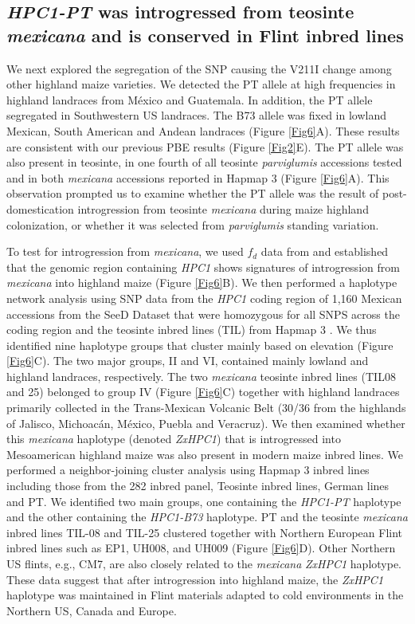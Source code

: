 \documentclass[9pt,twocolumn,twoside,lineno]{biorxiv}
\begin{document}
\subsection{\textit{HPC1-PT} was introgressed from teosinte \textit{mexicana} and is conserved in Flint inbred lines} 
We next explored the segregation of the SNP causing the V211I change among other highland maize varieties.
We detected the PT allele at high frequencies in highland landraces from México and Guatemala. In addition, the PT allele segregated in Southwestern US landraces. 
The B73 allele was fixed in lowland Mexican, South American and Andean landraces (Figure \ref{Fig6}A). 
These results are consistent with our previous PBE results (Figure \ref{Fig2}E).
The PT allele was also present in teosinte, in one fourth of all teosinte \textit{parviglumis} accessions tested and in both \textit{mexicana} accessions reported in Hapmap 3 \cite{Bukowski2017-ng} (Figure \ref{Fig6}A). 
This observation prompted us to examine whether the PT allele was the result of post-domestication introgression from teosinte \textit{mexicana} during maize highland colonization, or whether it was selected from \textit{parviglumis} standing variation.

To test for introgression from \textit{mexicana}, we used \(f_d\) data from \cite{Gonzalez-Segovia2019-jy} and established that the genomic region containing \textit{HPC1} shows signatures of introgression from \textit{mexicana} into highland maize (Figure \ref{Fig6}B).
We then performed a haplotype network analysis using SNP data from the \textit{HPC1} coding region of 1,160 Mexican accessions from the SeeD Dataset \cite{Romero_Navarro2017-cn} that were homozygous for all SNPS across the coding region and the teosinte inbred lines (TIL) from Hapmap 3 \cite{Bukowski2017-ng}.   
We thus identified nine haplotype groups that cluster mainly based on elevation (Figure \ref{Fig6}C). 
The two major groups, II and VI, contained mainly lowland and highland landraces, respectively. 
The two \textit{mexicana} teosinte inbred lines (TIL08 and 25) belonged to group IV  (Figure \ref{Fig6}C) together with highland landraces primarily collected in the Trans-Mexican Volcanic Belt (30/36 from the highlands of Jalisco, Michoacán, México, Puebla and Veracruz).
We then examined whether this \textit{mexicana} haplotype (denoted \textit{ZxHPC1}) that is introgressed into Mesoamerican highland maize was also present in modern maize inbred lines. 
We performed a neighbor-joining cluster analysis using Hapmap 3 inbred lines including those from the 282 inbred panel, Teosinte inbred lines, German lines and PT. 
We identified two main groups, one containing the \textit{HPC1-PT} haplotype and the other containing the \textit{HPC1-B73} haplotype.
PT and the teosinte \textit{mexicana} inbred lines TIL-08 and TIL-25 clustered together with Northern European Flint inbred lines such as EP1, UH008, and UH009 (Figure \ref{Fig6}D). 
Other Northern US flints, e.g., CM7, are also closely related to the \textit{mexicana} \textit{ZxHPC1} haplotype. 
These data suggest that after introgression into highland maize, the \textit{ZxHPC1} haplotype was maintained in Flint materials adapted to cold environments in the Northern US, Canada and Europe. 
\end{document}
